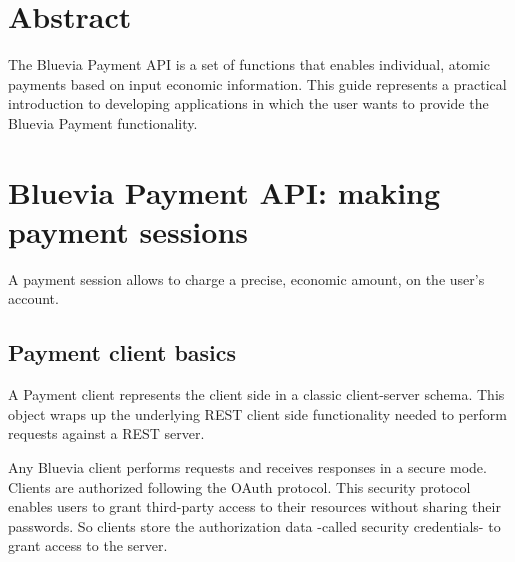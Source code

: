 \hypertarget{blv_payment_guide_call_abstract_sec}{}\section{Abstract}\label{blv_payment_guide_call_abstract_sec}
The Bluevia Payment API is a set of functions that enables individual, atomic payments based on input economic information. This guide represents a practical introduction to developing applications in which the user wants to provide the Bluevia Payment functionality.\hypertarget{blv_payment_guide_blv_payment_api_making_payment_session_sec}{}\section{Bluevia Payment API: making payment sessions}\label{blv_payment_guide_blv_payment_api_making_payment_session_sec}
A payment session allows to charge a precise, economic amount, on the user's account.\hypertarget{blv_payment_guide_payment_client_basics_sec}{}\subsection{Payment client basics}\label{blv_payment_guide_payment_client_basics_sec}
A Payment client represents the client side in a classic client-\/server schema. This object wraps up the underlying REST client side functionality needed to perform requests against a REST server.

Any Bluevia client performs requests and receives responses in a secure mode. Clients are authorized following the OAuth protocol. This security protocol enables users to grant third-\/party access to their resources without sharing their passwords. So clients store the authorization data -\/called security credentials-\/ to grant access to the server.

